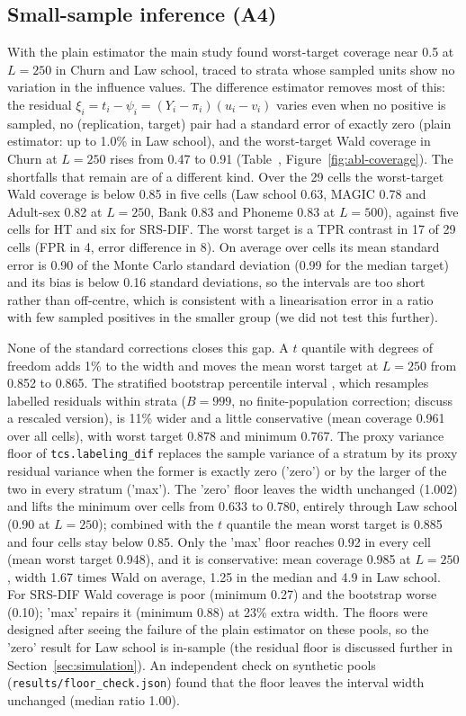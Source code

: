 \subsection{Small-sample inference (A4)}

With the plain estimator the main study found worst-target coverage near 0.5 at $L=250$ in Churn and Law school, traced to strata whose sampled units show no variation in the influence values. The difference estimator removes most of this: the residual $\xi_i=t_i-\psi_i=(Y_i-\pi_i)(u_i-v_i)$ varies even when no positive is sampled, no (replication, target) pair had a standard error of exactly zero (plain estimator: up to 1.0\% in Law school), and the worst-target Wald coverage in Churn at $L=250$ rises from 0.47 to 0.91 (Table~, Figure~\ref{fig:abl-coverage}). The shortfalls that remain are of a different kind. Over the 29 cells the worst-target Wald coverage is below 0.85 in five cells (Law school 0.63, MAGIC 0.78 and Adult-sex 0.82 at $L=250$, Bank 0.83 and Phoneme 0.83 at $L=500$), against five cells for HT and six for SRS-DIF. The worst target is a TPR contrast in 17 of 29 cells (FPR in 4, error difference in 8). On average over cells its mean standard error is 0.90 of the Monte Carlo standard deviation (0.99 for the median target) and its bias is below 0.16 standard deviations, so the intervals are too short rather than off-centre, which is consistent with a linearisation error in a ratio with few sampled positives in the smaller group (we did not test this further).

None of the standard corrections closes this gap. A $t$ quantile with \citet{satterthwaite1946} degrees of freedom adds 1\% to the width and moves the mean worst target at $L=250$ from 0.852 to 0.865. The stratified bootstrap percentile interval \citep{efron1979}, which resamples labelled residuals within strata ($B=999$, no finite-population correction; \citealt{raowu1988} discuss a rescaled version), is 11\% wider and a little conservative (mean coverage 0.961 over all cells), with worst target 0.878 and minimum 0.767. The proxy variance floor of \texttt{tcs.labeling\_dif} replaces the sample variance of a stratum by its proxy residual variance when the former is exactly zero ('zero') or by the larger of the two in every stratum ('max'). The 'zero' floor leaves the width unchanged (1.002) and lifts the minimum over cells from 0.633 to 0.780, entirely through Law school (0.90 at $L=250$); combined with the $t$ quantile the mean worst target is 0.885 and four cells stay below 0.85. Only the 'max' floor reaches 0.92 in every cell (mean worst target 0.948), and it is conservative: mean coverage 0.985 at $L=250$, width 1.67 times Wald on average, 1.25 in the median and 4.9 in Law school. For SRS-DIF Wald coverage is poor (minimum 0.27) and the bootstrap worse (0.10); 'max' repairs it (minimum 0.88) at 23\% extra width. The floors were designed after seeing the failure of the plain estimator on these pools, so the 'zero' result for Law school is in-sample (the residual floor is discussed further in Section~\ref{sec:simulation}). An independent check on synthetic pools (\texttt{results/floor\_check.json}) found that the floor leaves the interval width unchanged (median ratio 1.00).

